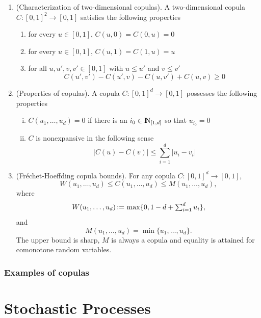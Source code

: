 \documentclass[a4paper,10pt]{scrbook}
\begin{document}
\begin{enumerate}
 \item (Characterization of two-dimensional copulas). A two-dimensional copula 
       \(C: [0,1]^2 \to [0,1]\) satisfies the following properties
       \begin{enumerate}[i]
        \item for every \(u\in[0,1]\), \(C(u,0) = C(0,u) = 0\)
        \item for every \(u\in[0,1]\), \(C(u, 1) = C(1, u) = u\)
        \item for all \(u,u',v,v' \in [0,1]\) with \(u\leq u'\) and \(v\leq v'\)
        \[
         C(u', v')  - C(u', v) - C(u,v') + C(u,v) \geq 0
        \]
       \end{enumerate}
 
 \item (Properties of copulas). A copula \(C:[0,1]^d\to[0,1]\) possesses the following 
       properties
       \begin{enumerate}[i.]
        \item \(C(u_1, \ldots, u_d)=0\) if there is an \(i_0\in\N_{[1,d]}\) so that \(u_{i_0}=0\)
        \item \(C\) is nonexpansive in the following sense
        \[
         |C(u) - C(v)| \leq \sum_{i=1}^{d}|u_i - v_i|
        \]

       \end{enumerate}


 \item (Fr{\'e}chet-Hoeffding copula bounds). For any copula \(C:[0,1]^d\to[0,1]\), 
       \[
        W(u_1,\ldots, u_d) \leq C(u_1,\ldots, u_d) \leq M(u_1,\ldots, u_d),
       \]
       where 
       \[
        W(u_1,\ldots, u_d) {}\mathop{\mathrel{:}=}{} \max\{0, 1-d+\textstyle\sum_{i=1}^{d}u_i\},
       \]
       and
       \[
        M(u_1,\ldots, u_d) = \min\{u_1,\ldots, u_d\}.
       \]
       The upper bound is sharp, \(M\) is always a copula and equality is attained
       for comonotone random variables. 
\end{enumerate}

\subsection{Examples of copulas}


\chapter{Stochastic Processes}\label{sec:stoch-proc}
\end{document}
